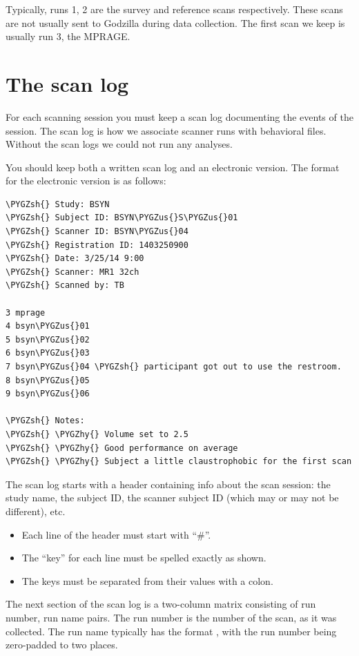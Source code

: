 \documentclass[letterpaper,10pt,openany,oneside]{sphinxmanual}
\def\PYGZus{\char`\_}
\def\PYGZsh{\char`\#}
\def\PYGZhy{\char`\-}
\begin{document}
Typically, runs 1, 2 are the survey and reference scans respectively. These
scans are not usually sent to Godzilla during data collection. The first scan
we keep is usually run 3, the MPRAGE.


\section{The scan log}
\label{data_organization:the-scan-log}
For each scanning session you must keep a scan log documenting the events of
the session. The scan log is how we associate scanner runs with behavioral
files. Without the scan logs we could not run any analyses.

You should keep both a written scan log and an electronic version. The format
for the electronic version is as follows:

\begin{Verbatim}[commandchars=\\\{\}]
\PYGZsh{} Study: BSYN
\PYGZsh{} Subject ID: BSYN\PYGZus{}S\PYGZus{}01
\PYGZsh{} Scanner ID: BSYN\PYGZus{}04
\PYGZsh{} Registration ID: 1403250900
\PYGZsh{} Date: 3/25/14 9:00
\PYGZsh{} Scanner: MR1 32ch
\PYGZsh{} Scanned by: TB

3 mprage
4 bsyn\PYGZus{}01
5 bsyn\PYGZus{}02
6 bsyn\PYGZus{}03
7 bsyn\PYGZus{}04 \PYGZsh{} participant got out to use the restroom.
8 bsyn\PYGZus{}05
9 bsyn\PYGZus{}06

\PYGZsh{} Notes:
\PYGZsh{} \PYGZhy{} Volume set to 2.5
\PYGZsh{} \PYGZhy{} Good performance on average
\PYGZsh{} \PYGZhy{} Subject a little claustrophobic for the first scan
\end{Verbatim}

The scan log starts with a header containing info about the scan session: the
study name, the subject ID, the scanner subject ID (which may or may not be
different), etc.
\begin{itemize}
\item {} 
Each line of the header must start with ``\#''.

\item {} 
The ``key'' for each line must be spelled exactly as shown.

\item {} 
The keys must be separated from their values with a colon.

\end{itemize}

The next section of the scan log is a two-column matrix consisting of run
number, run name pairs. The run number is the number of the scan, as it was
collected. The run name typically has the format , with the
run number being zero-padded to two places.
\end{document}

